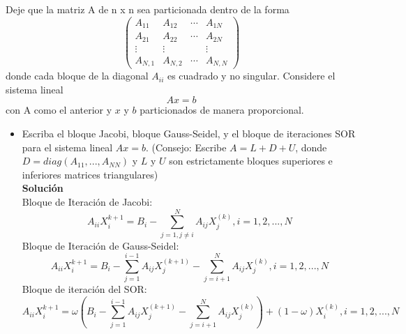 Deje que la matriz A de n x n sea particionada dentro de la forma
\[\begin{pmatrix} 
A_{11} & A_{12} & \cdots & A_{1N} \\ 
A_{21} & A_{22} & \cdots & A_{2N} \\ 
\vdots & \vdots &     & \vdots \\ 
A_{N,1} & A_{N,2} & \cdots & A_{N,N}  
\end{pmatrix} \]
donde cada bloque de la diagonal $A_{ii}$ es cuadrado y no singular. Considere el sistema lineal
\[Ax=b\]
con A como el anterior y $x$ y $b$ particionados de manera proporcional.
\begin{itemize}
\item Escriba el bloque Jacobi, bloque Gauss-Seidel, y el bloque de iteraciones SOR para el sistema lineal $Ax =b$. (Consejo: Escribe $A=L+D+U$, donde $D=diag(A_{11},...,A_{NN})$ y $L$ y $U$ son estrictamente bloques superiores e inferiores matrices triangulares)\\
\textbf{Solución}\\
Bloque de Iteración de Jacobi:\\
\[A_{ii}X_i^{k+1} = B_i - \sum_{j=1, j\neq i}^N A_{ij}X_j^{(k)} , i=1,2,...,N\]
Bloque de Iteración de Gauss-Seidel:\\
\[A_{ii}X_i^{k+1} = B_i - \sum_{j=1}^{i-1} A_{ij}X_j^{(k+1)} - \sum_{j=i+1}^N A_{ij}X_j^{(k)}, i=1,2,...,N\]
Bloque de iteración del SOR:\\
\[A_{ii}X_i^{k+1} =\omega(B_i - \sum_{j=1}^{i-1} A_{ij}X_j^{(k+1)} - \sum_{j=i+1}^N A_{ij}X_j^{(k)}) + (1-\omega)X_i^{(k)}, i=1,2,...,N\]


\end{itemize}
